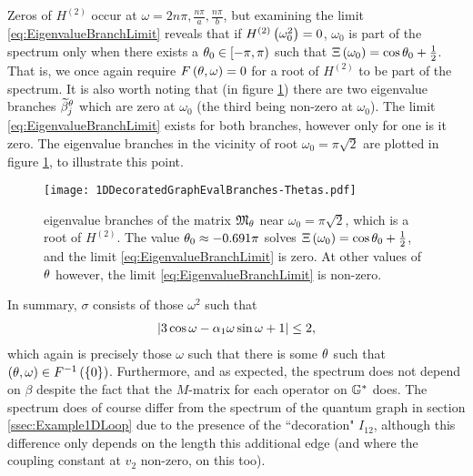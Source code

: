 Zeros of $H^{(2)}$ occur at $\omega= 2n\pi, \frac{n\pi}{a}, \frac{n\pi}{b}$, but examining the limit \eqref{eq:EigenvalueBranchLimit} reveals that if $H^{(2)}\left( \omega_0^2 \right)=0$, $\omega_0$ is part of the spectrum only when there exists a $\theta_0\in\left[-\pi,\pi\right)$ such that $\Xi\left( \omega_0 \right)=\cos\theta_0+\frac{1}{2}$.
That is, we once again require $F\left( \theta,\omega \right)=0$ for a root of $H^{(2)}$ to be part of the spectrum.
It is also worth noting that (in figure \ref{fig:1DDecoratedGraphEvalBranches-Thetas}) there are two eigenvalue branches $\widetilde{\beta}_j^{\theta}$ which are zero at $\omega_0$ (the third being non-zero at $\omega_0$).
The limit \eqref{eq:EigenvalueBranchLimit} exists for both branches, however only for one is it zero.
The eigenvalue branches in the vicinity of root $\omega_0=\pi\sqrt{2}$ are plotted in figure \ref{fig:1DDecoratedGraphEvalBranches-Thetas}, to illustrate this point.
\begin{figure}[b!]
	\centering
	\texttt{[image: 1DDecoratedGraphEvalBranches-Thetas.pdf]}
	\caption[Eigenvalue branches of the $M$-matrix near a pole of the determinant, for the geometry of section \ref{ssec:EmbeddingDependentExample}.]{\label{fig:1DDecoratedGraphEvalBranches-Thetas} eigenvalue branches of the matrix $\mathfrak{M}_{\theta}$ near $\omega_0 = \pi\sqrt{2}$, which is a root of $H^{(2)}$. The value $\theta_0\approx-0.691\pi$ solves $\Xi\left( \omega_0 \right)=\cos\theta_0+\frac{1}{2}$, and the limit \eqref{eq:EigenvalueBranchLimit} is zero. At other values of $\theta$ however, the limit \eqref{eq:EigenvalueBranchLimit} is non-zero.}
\end{figure}
In summary, $\sigma$ consists of those $\omega^2$ such that
\begin{align*}
	\left\lvert  3\cos\omega - \alpha_1\omega\sin\omega + 1  \right\rvert \leq 2,
\end{align*}
which again is precisely those $\omega$ such that there is some $\theta$ such that $\left( \theta,\omega \right)\in F^{-1}\left( \left\{ 0 \right\} \right)$.
Furthermore, and as expected, the spectrum does not depend on $\beta$ despite the fact that the $M$-matrix for each operator on $\mathbb{G}^*$ does.
The spectrum does of course differ from the spectrum of the quantum graph in section \ref{ssec:Example1DLoop} due to the presence of the ``decoration" $I_{12}$, although this difference only depends on the length this additional edge (and where the coupling constant at $v_2$ non-zero, on this too).

